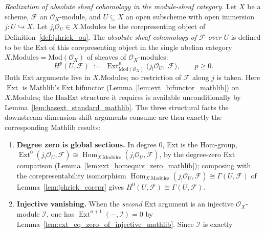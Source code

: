 \begin{definition}\leanok
  \label{def:absolute_cohomology}
  \textit{Realization of absolute sheaf cohomology in the module-sheaf category.}
  Let \(X\) be a scheme, \(\mathcal{F}\) an \(\mathcal{O}_X\)-module, and \(U \subseteq
  X\) an open subscheme with open immersion \(j : U \hookrightarrow X\). Let
  \(j_!\mathcal{O}_U \in X.\mathrm{Modules}\) be the corepresenting object of
  Definition~\ref{def:jshriek_ou}. The \emph{absolute sheaf cohomology of \(\mathcal{F}\)
  over \(U\)} is defined to be the Ext of this corepresenting object in the single
  abelian category \(X.\mathrm{Modules} = \mathrm{Mod}(\mathcal{O}_X)\) of sheaves of
  \(\mathcal{O}_X\)-modules:
  \[
    H^p(U, \mathcal{F}) \;:=\; \operatorname{Ext}^p_{\mathrm{Mod}(\mathcal{O}_X)}
      \bigl(j_!\mathcal{O}_U,\; \mathcal{F}\bigr),
    \qquad p \geq 0.
  \]
  Both Ext arguments live in \(X.\mathrm{Modules}\); no restriction of \(\mathcal{F}\)
  along \(j\) is taken. Here \(\operatorname{Ext}\) is Mathlib's Ext bifunctor
  (Lemma~\ref{lem:ext_bifunctor_mathlib}) on \(X.\mathrm{Modules}\); the
  \(\mathrm{HasExt}\) structure it requires is available unconditionally by
  Lemma~\ref{lem:hasext_standard_mathlib}. The three structural facts the downstream
  dimension-shift arguments consume are then exactly the corresponding Mathlib results:
  \begin{enumerate}
  \item \textbf{Degree zero is global sections.} In degree \(0\), Ext is the Hom-group,
    \(\operatorname{Ext}^0(j_!\mathcal{O}_U, \mathcal{F}) \cong
    \operatorname{Hom}_{X.\mathrm{Modules}}(j_!\mathcal{O}_U, \mathcal{F})\), by the
    degree-zero Ext comparison (Lemma~\ref{lem:ext_homequiv_zero_mathlib}); composing
    with the corepresentability isomorphism
    \(\operatorname{Hom}_{X.\mathrm{Modules}}(j_!\mathcal{O}_U, \mathcal{F}) \cong
    \Gamma(U, \mathcal{F})\) of Lemma~\ref{lem:jshriek_corepr} gives \(H^0(U,
    \mathcal{F}) \cong \Gamma(U, \mathcal{F})\).
  \item \textbf{Injective vanishing.} When the \emph{second} Ext argument is an
    injective \(\mathcal{O}_X\)-module \(\mathcal{I}\), one has
    \(\operatorname{Ext}^{n+1}(-, \mathcal{I}) = 0\) by
    Lemma~\ref{lem:ext_eq_zero_of_injective_mathlib}. Since \(\mathcal{I}\) is exactly

\end{enumerate}
\end{definition}
